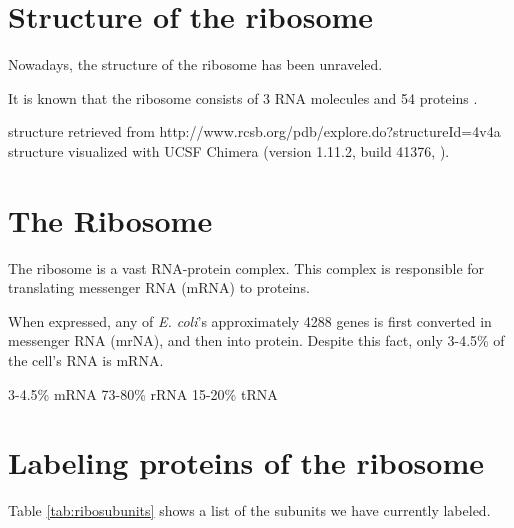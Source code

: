 

\section{Structure of the ribosome}

Nowadays, the structure of the ribosome has been unraveled.

It is known that the ribosome consists of 3 RNA molecules and 54 proteins \cite{Chen2013}.%

structure retrieved from
http://www.rcsb.org/pdb/explore.do?structureId=4v4a
structure visualized with UCSF Chimera (version 1.11.2, build 41376, \cite{pettersen2004}).



% 



\section{The Ribosome}





The ribosome is a vast RNA-protein complex. 
This complex is responsible for translating messenger RNA (mRNA) to proteins.


When expressed, any of \textit{E. coli}'s approximately 4288 genes \cite{Blattner1997} is first converted in messenger RNA (mrNA), and then into protein.
Despite this fact, only 3-4.5\% of the cell's RNA is mRNA.


3-4.5\% mRNA
73-80\% rRNA
15-20\% tRNA

\cite{Norris1972}


\section{Labeling proteins of the ribosome}

Table \ref{tab:ribosubunits} shows a list of the subunits we have currently labeled.

